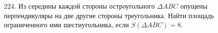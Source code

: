 224. Из середины каждой стороны остроугольного $\Delta ABC$ опущены перпендикуляры на две другие стороны треугольника. Найти площадь ограниченного ими шестиугольника, если $S(\Delta ABC)=8.$\\
